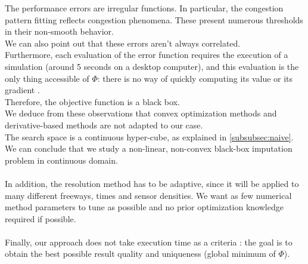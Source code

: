 
The performance errors are irregular functions. In particular, the congestion pattern fitting reflects congestion phenomena. These present numerous thresholds in their non-smooth behavior.\\
We can also point out that these errors aren't always correlated.\\
Furthermore, each evaluation of the error function requires the execution of a simulation (around 5 seconds on a desktop computer), and this evaluation is the only thing accessible of $\Phi$: there is no way of quickly computing its value or its gradient .\\
Therefore, the objective function is a black box.\\
We deduce from these observations that convex optimization methods and derivative-based methods are not adapted to our case.\\
The search space is a continuous hyper-cube, as explained in \ref{subsubsec:naive}.\\
We can conclude that we study a non-linear, non-convex black-box imputation problem in continuous domain.\\
\\ 	
In addition, the resolution method has to be adaptive, since it will be applied to many different freeways, times and sensor densities. We want as few numerical method parameters to tune as possible and  no prior optimization knowledge required if possible.\\
\\
Finally, our approach does not take execution time as a criteria : the goal is to obtain the best possible result quality and uniqueness (global minimum of $\Phi$).
